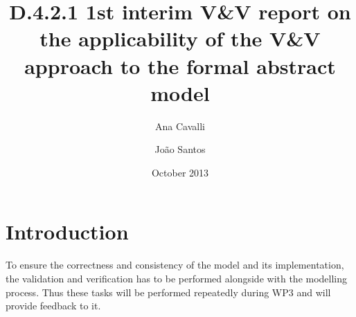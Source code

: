\documentclass{template/openetcs_article}
\begin{document}
\frontmatter
{}




\title{D.4.2.1 1st interim V\&V report on the applicability of the V\&V approach to the formal abstract model}

\subtitle{}

\date{October 2013}

\author{Ana Cavalli \and João Santos}

  

\reporttype{}






\maketitle
\tableofcontents
\listoffiguresandtables
\newpage




\section*{Introduction}

To ensure the correctness and consistency of the model and its implementation, the validation
and verification has to be performed alongside with the modelling process. Thus these tasks will
be performed repeatedly during WP3 and will provide feedback to it.
\end{document}
